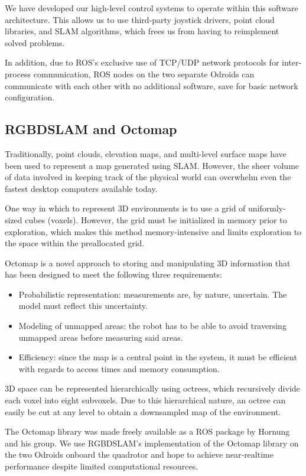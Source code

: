 \documentclass[12pt,letterpaper]{article} \usepackage[margin=1in]{geometry}
\begin{document}
We have developed our high-level control systems to operate within this
software architecture. This allows us to use third-party joystick drivers,
point cloud libraries, and SLAM algorithms, which frees us from having to
reimplement solved problems.

In addition, due to ROS's exclusive use of TCP/UDP network protocols for
inter-process communication, ROS nodes on the two separate Odroids can
communicate with each other with no additional software, save for basic network
configuration.


\subsection*{RGBDSLAM and Octomap}

Traditionally, point clouds, elevation maps, and multi-level surface maps have
been used to represent a map generated using SLAM. However, the sheer volume of
data involved in keeping track of the physical world can overwhelm even the
fastest desktop computers available today.

One way in which to represent 3D environments is to use a grid of
uniformly-sized cubes (voxels). However, the grid must be initialized in memory
prior to exploration, which makes this method memory-intensive and limits
exploration to the space within the preallocated grid.

Octomap is a novel approach to storing and manipulating 3D information that has
been designed to meet the following three requirements:

\begin{itemize}
	\item Probabilistic representation: measurements are, by nature, uncertain.
		The model must reflect this uncertainty.
	\item Modeling of unmapped areas: the robot has to be able to avoid
		traversing unmapped areas before measuring said areas.
	\item Efficiency: since the map is a central point in the system, it must
		be efficient with regards to access times and memory consumption.
\end{itemize}

3D space can be represented hierarchically using octrees, which recursively
divide each voxel into eight subvoxels. Due to this hierarchical nature, an
octree can easily be cut at any level to obtain a downsampled map of the
environment.

The Octomap library was made freely available as a ROS package by Hornung and
his group. We use RGBDSLAM's implementation of the Octomap library on the two
Odroids onboard the quadrotor and hope to achieve near-realtime performance
despite limited computational resources.
\end{document}
